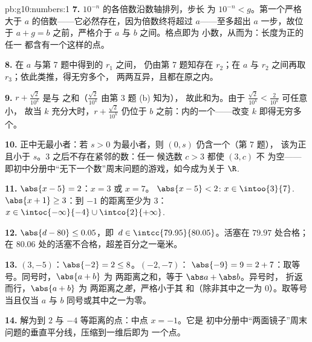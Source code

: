 \begin{solution}{pb:g10:numbers:1}
\textbf{7.} $10^{-n}$ 的各倍数沿数轴排列，步长
为 $10^{-n} < g$。第一个严格大于
$a$ 的倍数——它必然存在，因为倍数终将超过
$a$——至多超出 $a$ 一步，故位于
$a + g = b$ 之前，严格介于 $a$ 与 $b$ 之间。格点即为
小数，从而为：长度为正的任一
都含有一个这样的点。

\textbf{8.} 在 $a$ 与第 7 题中得到的 $r_1$ 之间，
仍由第 7 题知存在 $r_2$；在
$a$ 与 $r_2$ 之间再取 $r_3$；依此类推，得无穷多个，
两两互异，且都在原之内。

\textbf{9.} $r + \frac{\sqrt2}{10^k}$ 是与
之和（$\frac{\sqrt2}{10^k}$ 由第 3 题 (b) 知为），
故此和为。由于
$\frac{\sqrt2}{10^k} < \frac{2}{10^k}$ 可任意小，
故当 $k$ 充分大时，$r + \frac{\sqrt2}{10^k}$ 仍位于
$b$ 之前：内的一个——改变
$k$ 即得无穷多个。

\textbf{10.} 正中无最小者：若 $s > 0$ 为最小者，则
 $(0, s)$ 仍含一个（第 7 题），
该为正且小于 $s$。$3$ 之后不存在紧邻的数：任一
候选数 $c > 3$ 都使 $(3, c)$ 不
为空——即初中分册中“无下一个数”周末问题的游戏，如今成为关于
$\R$.

\textbf{11.} $\abs{x - 5} = 2$：$x = 3$ 或 $x = 7$。
$\abs{x - 5} < 2$: $x \in \intoo{3}{7}$.
$\abs{x + 1} \geq 3$：到 $-1$ 的距离至少为 $3$：
$x \in \intoc{-\infty}{-4} \cup \intco{2}{+\infty}$.

\textbf{12.} $\abs{d - 80} \leq 0.05$，即\
$d \in \intcc{79.95}{80.05}$。活塞在 $79.97$ 处合格；
在 $80.06$ 处的活塞不合格，超差百分之一毫米。

\textbf{13.} $(3, -5)$：$\abs{-2} = 2 \leq 8$。$(-2, -7)$：
$\abs{-9} = 9 = 2 + 7$：取等号。同号时，$\abs{a + b}$ 为
两距离之和，等于 $\abs a + \abs b$。异号时，
折返而行，$\abs{a + b}$ 为
两距离之\emph{差}，严格小于其
和（除非其中之一为 $0$）。取等号当且仅当 $a$ 与
$b$ 同号或其中之一为零。

\textbf{14.} 解为到 $2$
与 $-4$ 等距离的点：中点 $x = -1$。它是
初中分册中“两面镜子”周末问题的垂直平分线，压缩到一维后即为
一个点。


\end{solution}
